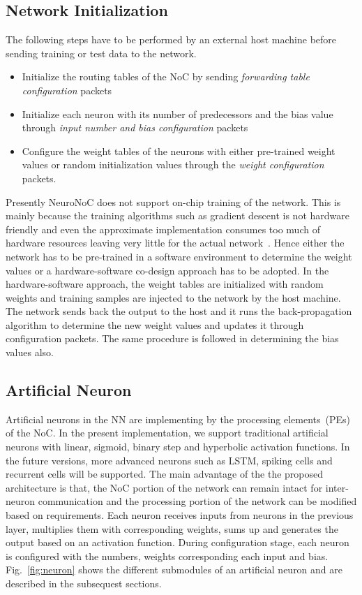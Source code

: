 \subsection{Network Initialization}
The following steps have to be performed by an external host machine before sending training or test data to the network.
\begin{itemize}
\item Initialize the routing tables of the NoC by sending \emph{forwarding table configuration} packets
\item Initialize each neuron with its number of predecessors and the bias value through \emph{input number and bias configuration} packets
\item Configure the weight tables of the neurons with either pre-trained weight values or random initialization values through the \emph{weight configuration} packets.
\end{itemize}
Presently NeuroNoC does not support on-chip training of the network.
This is mainly because the training algorithms such as gradient descent is not hardware friendly and even the approximate implementation consumes too much of hardware resources leaving very little for the actual network~\cite{}.
Hence either the network has to be pre-trained in a software environment to determine the weight values or a hardware-software co-design approach has to be adopted.
In the hardware-software approach, the weight tables are initialized with random weights and training samples are injected to the network by the host machine.
The network sends back the output to the host and it runs the back-propagation algorithm to determine the new weight values and updates it through configuration packets.
The same procedure is followed in determining the bias values also.
\subsection{Artificial Neuron}
Artificial neurons in the NN are implementing by the processing elements~(PEs) of the NoC.
In the present implementation, we support traditional artificial neurons with linear, sigmoid, binary step and hyperbolic activation functions.
In the future versions, more advanced neurons such as LSTM, spiking cells and recurrent cells will be supported.
The main advantage of the the proposed architecture is that, the NoC portion of the network can remain intact for inter-neuron communication and the processing portion of the network can be modified based on requirements.
Each neuron receives inputs from neurons in the previous layer, multiplies them with corresponding weights, sums up and generates the output based on an activation function.
During configuration stage, each neuron is configured with the numbers, weights corresponding each input and bias.
Fig.~\ref{fig:neuron} shows the different submodules of an artificial neuron and are described in the subsequest sections.
